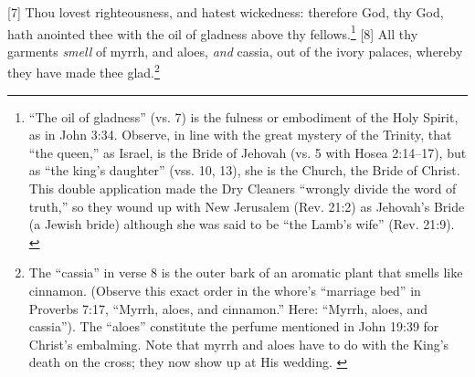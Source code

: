 [7] \textcolor[rgb]{0.00,0.00,1.00}{Thou lovest righteousness, and hatest wickedness: therefore God, thy God, hath anointed thee with the oil of gladness above thy fellows.}\footnote{“The oil of gladness” (vs. 7) is the fulness or embodiment of the Holy Spirit, as in John 3:34. Observe, in line with the great mystery of the Trinity, that “the queen,” as Israel, is the Bride of Jehovah (vs. 5 with Hosea 2:14–17), but as “the king’s daughter” (vss. 10, 13), she is the Church, the Bride of Christ. This double application made the Dry Cleaners “wrongly divide the word of truth,” so they wound up with New Jerusalem (Rev. 21:2) as Jehovah’s Bride (a Jewish bride) although she was said to be “the Lamb’s wife” (Rev. 21:9).  \cite{Ruckman1992Psalms}}
[8] \textcolor[rgb]{0.00,0.00,1.00}{All thy garments \emph{smell} of myrrh, and aloes, \emph{and} cassia, out of the ivory palaces, whereby they have made thee glad.}\footnote{The “cassia” in verse 8 is the outer bark of an aromatic plant that smells like cinnamon. (Observe this exact order in the whore’s “marriage bed” in Proverbs 7:17, “Myrrh, aloes, and cinnamon.” Here: “Myrrh, aloes, and cassia”). The “aloes” constitute the perfume mentioned in John 19:39 for Christ’s embalming. Note that myrrh and aloes have to do with the King’s death on the cross; they now show up at His wedding. \cite{Ruckman1992Psalms}}
